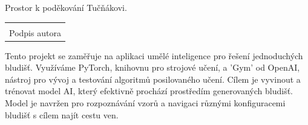 \documentclass[12pt, a4paper,
twoside,        %
openright
]{report}
\newcommand\datumOdevzdani{1. 1. 2024} %
\begin{document}
\cleardoublepage %
	

	
	\noindent Prostor k poděkování Tučňákovi.
	
	\vspace*{0.7\textheight} %

	\vfill
	\noindent{V Opavě \datumOdevzdani\\}
	\noindent
	\begin{minipage}{\linewidth}
		\hspace{9.5cm} 
		\begin{tabular}{@{}p{6cm}@{}}
			\dotfill \\
			Podpis autora
		\end{tabular}
	\end{minipage}
	
	\cleardoublepage %


\noindent Tento projekt se zaměřuje na aplikaci umělé inteligence pro řešení jednoduchých bludišť. Využíváme PyTorch, knihovnu pro strojové učení, a 'Gym' od OpenAI, nástroj pro vývoj a testování algoritmů posilovaného učení. Cílem je vyvinout a trénovat model AI, který efektivně prochází prostředím generovaných bludišť. Model je navržen pro rozpoznávání vzorů a navigaci různými konfiguracemi bludišť s cílem najít cestu ven.

\vspace{18pt}
\end{document}
